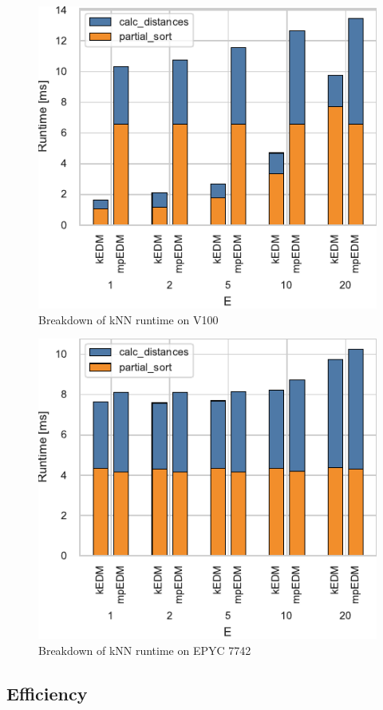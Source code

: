 \documentclass[conference]{IEEEtran}
\begin{document}
\begin{figure}
    \centering
    \includegraphics{figs/breakdown_v100}
    \caption{Breakdown of kNN runtime on V100}%
    \label{fig:architecture}
\end{figure}

\begin{figure}
    \centering
    \includegraphics{figs/breakdown_epyc}
    \caption{Breakdown of kNN runtime on EPYC 7742}%
    \label{fig:architecture}
\end{figure}

\subsection{Efficiency}
\end{document}
